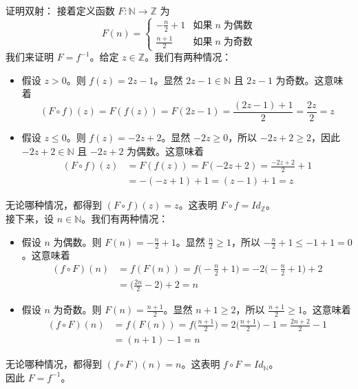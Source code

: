 \begin{example}
\begin{proofs}{证明双射：}
        接着定义函数 $F : \mathbb{N} \to \mathbb{Z}$ 为
        \[F(n) = \begin{cases}
                -\frac{n}{2} + 1 & \text{如果}\; n \;\text{为偶数} \\
                \frac{n+1}{2}    & \text{如果}\; n \;\text{为奇数}
            \end{cases}\]
        我们来证明 $F=f^{-1}$。给定 $z \in \mathbb{Z}$。我们有两种情况：
        \begin{itemize}
            \item 假设 $z > 0$。则 $f(z)=2z-1$。显然 $2z-1 \in \mathbb{N}$ 且 $2z-1$ 为奇数。这意味着
                  \[(F \circ f)(z) = F(f(z)) = F(2z - 1) = \frac{(2z-1)+1}{2} = \frac{2z}{2} = z\]
            \item 假设 $z \le 0$。则 $f(z)=-2z+2$。显然 $-2z \ge 0$，所以 $-2z + 2 \ge 2$，因此 $-2z + 2 \in \mathbb{N}$ 且 $-2z + 2$ 为偶数。这意味着
                  \begin{align*}
                      (F \circ f)(z) & = F(f(z)) = F(-2z + 2) = \frac{-2z + 2}{2}+1 \\
                                     & = -(-z + 1) + 1 = (z - 1) + 1 = z
                  \end{align*}
        \end{itemize}
        无论哪种情况，都得到 $(F \circ f)(z) = z$。这表明 $F \circ f = Id_{\mathbb{Z}}$。\\

        接下来，设 $n \in \mathbb{N}$。我们有两种情况：
        \begin{itemize}
            \item 假设 $n$ 为偶数。则 $F(n) = -\frac{n}{2} + 1$。显然 $\frac{n}{2} \ge 1$，所以 $-\frac{n}{2} + 1 \le -1+1=0$。这意味着
                  \begin{align*}
                      (f \circ F)(n) & = f(F(n)) = f\Big(-\frac{n}{2}+1\Big) = -2\Big(-\frac{n}{2}+1\Big)+2 \\
                                     & = \Big(\frac{2n}{2}-2\Big)+2=n
                  \end{align*}
            \item 假设 $n$ 为奇数。则 $F(n) = \frac{n+1}{2}$。显然 $n+1 \ge 2$，所以 $\frac{n+1}{2} \ge 1$。这意味着
                  \begin{align*}
                      (f \circ F)(n) & = f(F(n)) = f\Big(\frac{n+1}{2}\Big) = 2(\frac{n+1}{2}\Big)-1 = \frac{2n+2}{2}-1 \\
                                     & = (n + 1) -1 = n
                  \end{align*}
        \end{itemize}
        无论哪种情况，都得到 $(f \circ F)(n) = n$。这表明 $f \circ F = Id_{\mathbb{N}}$。\\

        因此 $F = f^{-1}$。
    \end{proofs}
\end{example}

